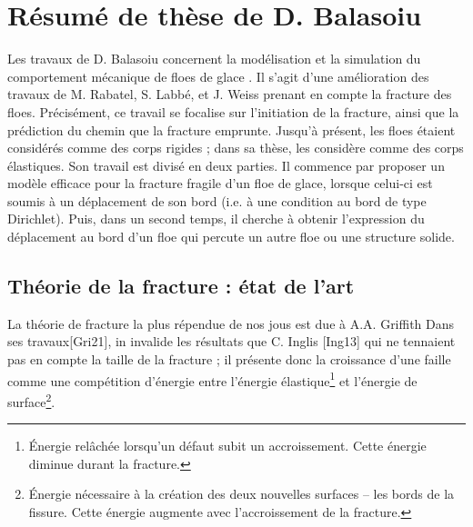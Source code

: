 
\section{Résumé de thèse de D. Balasoiu}

Les travaux de D. Balasoiu concernent la modélisation et la simulation du comportement mécanique de floes de glace \parencite{balasoiu2020thesis}. Il s'agit d'une amélioration des travaux de M. Rabatel, S. Labbé, et J. Weiss \parencite{rabatel2015thesis,rabatel2015dynamics} prenant en compte la fracture des floes. Précisément, ce travail se focalise sur l’initiation de la fracture, ainsi que la prédiction du chemin que la fracture emprunte. Jusqu’à présent, les floes étaient considérés comme des corps rigides ; dans sa thèse, \citeauthor{balasoiu2020thesis} les considère comme des corps élastiques. Son travail est divisé en deux parties. Il commence par proposer un modèle efficace pour la fracture fragile d’un floe de glace, lorsque celui-ci est soumis à un déplacement de son bord (i.e. à une condition au bord de type Dirichlet). Puis, dans un second temps, il cherche à obtenir l’expression du déplacement au bord d’un floe qui percute un autre floe ou une structure solide.

\subsection{Théorie de la fracture : état de l’art} 
 
La théorie de fracture la plus répendue de nos jous est due à A.A. Griffith  Dans ses travaux[Gri21], in invalide les résultats que C. Inglis [Ing13] qui ne tennaient pas en compte la taille de la fracture ; il présente donc la croissance d'une faille comme une compétition d'énergie entre l'énergie élastique\footnote{Énergie relâchée lorsqu’un défaut subit un accroissement. Cette énergie diminue durant la fracture.} et l'énergie de surface\footnote{Énergie nécessaire à la création des deux nouvelles surfaces – les bords de la fissure. Cette énergie augmente avec l'accroissement de la fracture.}. 

